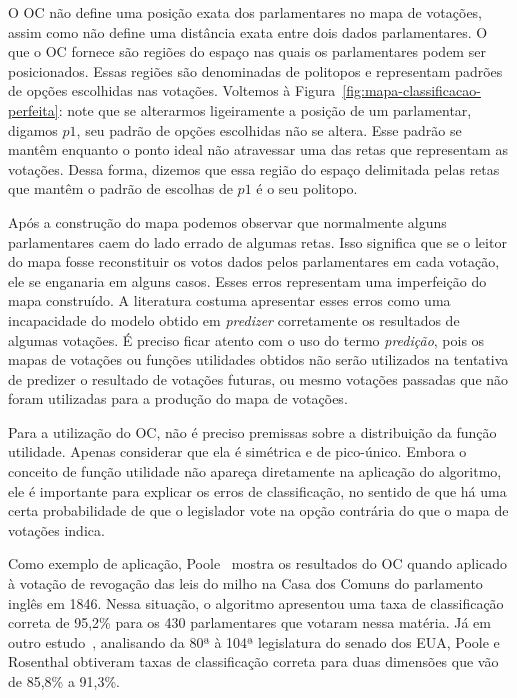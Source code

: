 \documentclass[a4paper, 12pt]{article}
\begin{document}
O OC não define uma posição exata dos parlamentares no mapa de votações, assim como não define uma distância exata entre dois dados parlamentares. O que o OC fornece são regiões do espaço nas quais os parlamentares podem ser posicionados. Essas regiões são denominadas de politopos e representam padrões de opções escolhidas nas votações. Voltemos à Figura~\ref{fig:mapa-classificacao-perfeita}: note que se alterarmos ligeiramente a posição de um parlamentar, digamos $p1$, seu padrão de opções escolhidas não se altera. Esse padrão se mantêm enquanto o ponto ideal não atravessar uma das retas que representam as votações. Dessa forma, dizemos que essa região do espaço delimitada pelas retas que mantêm o padrão de escolhas de $p1$ é o seu politopo.

Após a construção do mapa podemos observar que normalmente alguns parlamentares caem do lado errado de algumas retas. Isso significa que se o leitor do mapa fosse reconstituir os votos dados pelos parlamentares em cada votação, ele se enganaria em alguns casos. Esses erros representam uma imperfeição do mapa construído. A literatura costuma apresentar esses erros como uma incapacidade do modelo obtido em \emph{predizer} corretamente os resultados de algumas votações. É preciso ficar atento com o uso do termo \emph{predição}, pois os mapas de votações ou funções utilidades obtidos não serão utilizados na tentativa de predizer o resultado de votações futuras, ou mesmo votações passadas que não foram utilizadas para a produção do mapa de votações. 

Para a utilização do OC, não é preciso premissas sobre a distribuição da função utilidade. Apenas considerar que ela é simétrica e de pico-único. Embora o conceito de função utilidade não apareça diretamente na aplicação do algoritmo, ele é importante para explicar os erros de classificação, no sentido de que há uma certa probabilidade de que o legislador vote na opção contrária do que o mapa de votações indica.

Como exemplo de aplicação, Poole~\cite{poole2005book} mostra os resultados do OC quando aplicado à votação de revogação das leis do milho na Casa dos Comuns do parlamento inglês em 1846. Nessa situação, o algoritmo apresentou uma taxa de classificação correta de 95,2\% para os 430 parlamentares que votaram nessa matéria. Já em outro estudo~\cite{poole-rosenthal2000}, analisando da 80ª à 104ª legislatura do senado dos EUA, Poole e Rosenthal obtiveram taxas de classificação correta para duas dimensões que vão de 85,8\% a 91,3\%.
\end{document}
